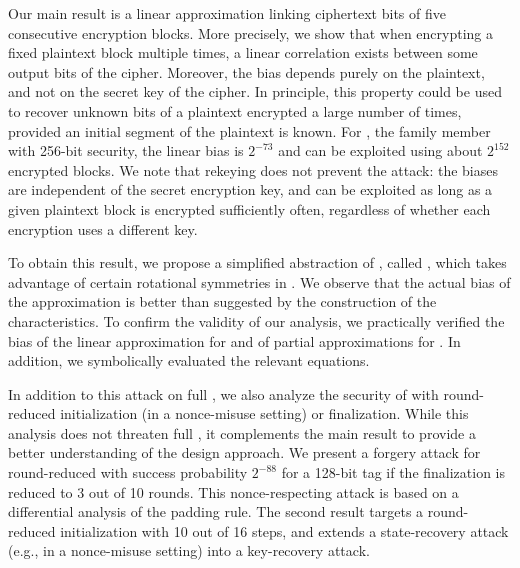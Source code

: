 Our main result is a linear approximation \cite{eurocryptMatsui93,eurocryptMatsuiY92} linking ciphertext bits of five consecutive encryption blocks.
More precisely, we show that when encrypting a fixed plaintext block multiple times, a linear correlation exists between some output bits of the cipher.
Moreover, the bias depends purely on the plaintext, and not on the secret key of the cipher.
In principle, this property could be used to recover unknown bits of a plaintext encrypted a large number of times, provided an initial segment of the plaintext is known.
For \morus[1280], the \morus family member with 256-bit security, the linear bias is $2^{-73}$
and can be exploited using about $2^{152}$ encrypted blocks.
We note that rekeying does not prevent the attack: the biases are independent of the secret encryption key, and can be exploited as long as a given plaintext block is encrypted sufficiently often, regardless of whether each encryption uses a different key.

To obtain this result, we propose a simplified abstraction of \morus, called \minimorus, which takes advantage of certain rotational symmetries in \morus.
We observe that the actual bias of the approximation is better than suggested by the construction of the characteristics.
To confirm the validity of our analysis,
we practically verified the bias of the linear approximation for \minimorus and of partial approximations for \morus.
In addition, we symbolically evaluated the relevant equations.

In addition to this attack on full \morus, we also analyze the security of \morus with round-reduced initialization (in a nonce-misuse setting) or finalization.
While this analysis does not threaten full \morus, it complements the main result to provide a better understanding of the \morus design approach.
We present a forgery attack for round-reduced \morus[1280] with success probability $2^{-88}$ for a 128-bit tag if the finalization is reduced to 3 out of 10 rounds. This nonce-respecting attack is based on a differential analysis of the padding rule.
The second result targets a round-reduced initialization with 10 out of 16 steps, and extends a state-recovery attack (e.g., in a nonce-misuse setting) into a key-recovery attack.

